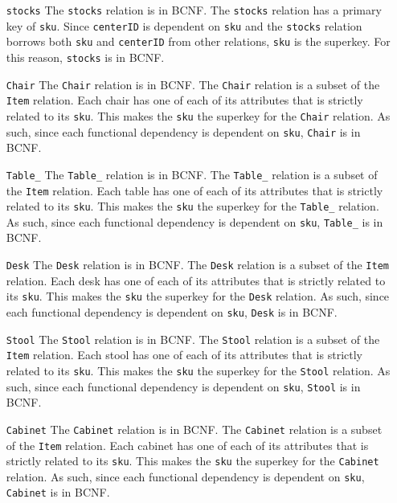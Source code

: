\documentclass[american,extrafontsizes,12pt,portrait,letterpaper,oneside,onecolumn,article,final]{memoir}
\newcommand*{\sqli}[1]{\texttt{#1}}
\begin{document}
\begin{enumerate}[leftmargin=*,widest={\texttt{DistributionCenter}}]
\item[\sqli{stocks}]
The \sqli{stocks} relation is in BCNF.
The \sqli{stocks} relation has a primary key of \sqli{sku}.
Since \sqli{centerID} is dependent on \sqli{sku} and the \sqli{stocks} relation borrows both \sqli{sku} and \sqli{centerID} from other relations, \sqli{sku} is the superkey.
For this reason, \sqli{stocks} is in BCNF.

\item[\sqli{Chair}]
The \sqli{Chair} relation is in BCNF.
The \sqli{Chair} relation is a subset of the \sqli{Item} relation.
Each chair has one of each of its attributes that is strictly related to its \sqli{sku}.
This makes the \sqli{sku} the superkey for the \sqli{Chair} relation.
As such, since each functional dependency is dependent on \sqli{sku}, \sqli{Chair} is in BCNF.

\item[\sqli{Table_}]
The \sqli{Table_} relation is in BCNF.
The \sqli{Table_} relation is a subset of the \sqli{Item} relation.
Each table has one of each of its attributes that is strictly related to its \sqli{sku}.
This makes the \sqli{sku} the superkey for the \sqli{Table_} relation.
As such, since each functional dependency is dependent on \sqli{sku}, \sqli{Table_} is in BCNF.

\item[\sqli{Desk}]
The \sqli{Desk} relation is in BCNF.
The \sqli{Desk} relation is a subset of the \sqli{Item} relation.
Each desk has one of each of its attributes that is strictly related to its \sqli{sku}.
This makes the \sqli{sku} the superkey for the \sqli{Desk} relation.
As such, since each functional dependency is dependent on \sqli{sku}, \sqli{Desk} is in BCNF.


\item[\sqli{Stool}]
The \sqli{Stool} relation is in BCNF.
The \sqli{Stool} relation is a subset of the \sqli{Item} relation.
Each stool has one of each of its attributes that is strictly related to its \sqli{sku}.
This makes the \sqli{sku} the superkey for the \sqli{Stool} relation.
As such, since each functional dependency is dependent on \sqli{sku}, \sqli{Stool} is in BCNF.

\item[\sqli{Cabinet}]
The \sqli{Cabinet} relation is in BCNF.
The \sqli{Cabinet} relation is a subset of the \sqli{Item} relation.
Each cabinet has one of each of its attributes that is strictly related to its \sqli{sku}.
This makes the \sqli{sku} the superkey for the \sqli{Cabinet} relation.
As such, since each functional dependency is dependent on \sqli{sku}, \sqli{Cabinet} is in BCNF.



\end{enumerate}
\end{document}
